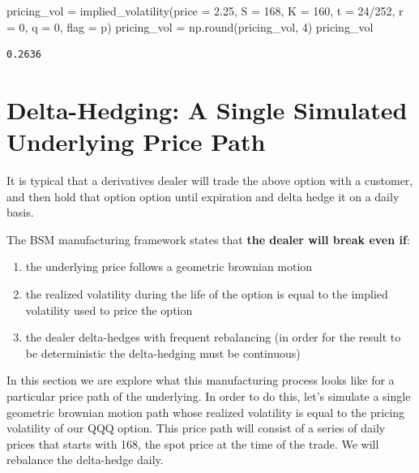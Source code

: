 \documentclass[
  letterpaper,
  DIV=11,
  numbers=noendperiod]{scrreprt}
\newenvironment{Shaded}{\begin{snugshade}}{\end{snugshade}}
\newcommand{\BuiltInTok}[1]{\textcolor[rgb]{0.00,0.23,0.31}{#1}}
\newcommand{\DecValTok}[1]{\textcolor[rgb]{0.68,0.00,0.00}{#1}}
\newcommand{\FloatTok}[1]{\textcolor[rgb]{0.68,0.00,0.00}{#1}}
\newcommand{\NormalTok}[1]{\textcolor[rgb]{0.00,0.23,0.31}{#1}}
\newcommand{\OperatorTok}[1]{\textcolor[rgb]{0.37,0.37,0.37}{#1}}
\newcommand{\StringTok}[1]{\textcolor[rgb]{0.13,0.47,0.30}{#1}}
\providecommand{\tightlist}{%
  \setlength{\itemsep}{0pt}\setlength{\parskip}{0pt}}\usepackage{longtable,booktabs,array}
\begin{document}
\begin{Shaded}
\begin{Highlighting}[]
\NormalTok{pricing\_vol }\OperatorTok{=}\NormalTok{ implied\_volatility(price }\OperatorTok{=} \FloatTok{2.25}\NormalTok{, S }\OperatorTok{=} \DecValTok{168}\NormalTok{, K }\OperatorTok{=} \DecValTok{160}\NormalTok{, t }\OperatorTok{=} \DecValTok{24}\OperatorTok{/}\DecValTok{252}\NormalTok{, r }\OperatorTok{=} \DecValTok{0}\NormalTok{, q }\OperatorTok{=} \DecValTok{0}\NormalTok{, flag }\OperatorTok{=} \StringTok{\textquotesingle{}p\textquotesingle{}}\NormalTok{)}
\NormalTok{pricing\_vol }\OperatorTok{=}\NormalTok{ np.}\BuiltInTok{round}\NormalTok{(pricing\_vol, }\DecValTok{4}\NormalTok{)}
\NormalTok{pricing\_vol}
\end{Highlighting}
\end{Shaded}

\begin{verbatim}
0.2636
\end{verbatim}

\hypertarget{delta-hedging-a-single-simulated-underlying-price-path}{%
\section{Delta-Hedging: A Single Simulated Underlying Price
Path}\label{delta-hedging-a-single-simulated-underlying-price-path}}

It is typical that a derivatives dealer will trade the above option with
a customer, and then hold that option option until expiration and delta
hedge it on a daily basis.

The BSM manufacturing framework states that \textbf{the dealer will
break even if}:

\begin{enumerate}
\def\labelenumi{\arabic{enumi}.}
\tightlist
\item
  the underlying price follows a geometric brownian motion
\item
  the realized volatility during the life of the option is equal to the
  implied volatility used to price the option
\item
  the dealer delta-hedges with frequent rebalancing (in order for the
  result to be deterministic the delta-hedging must be continuous)
\end{enumerate}

In this section we are explore what this manufacturing process looks
like for a particular price path of the underlying. In order to do this,
let's simulate a single geometric brownian motion path whose realized
volatility is equal to the pricing volatility of our QQQ option. This
price path will consist of a series of daily prices that starts with
168, the spot price at the time of the trade. We will rebalance the
delta-hedge daily.
\end{document}
